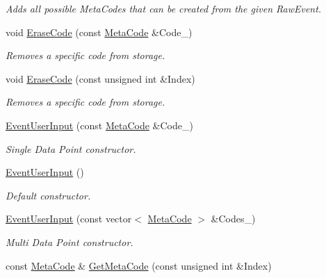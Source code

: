 \begin{DoxyCompactItemize}
\begin{DoxyCompactList}\small\item\em Adds all possible MetaCodes that can be created from the given RawEvent. \item\end{DoxyCompactList}\item 
void \hyperlink{classphys_1_1EventUserInput_a34c05a76a790435799441da75a83fa9c}{EraseCode} (const \hyperlink{classphys_1_1MetaCode}{MetaCode} \&Code\_\-)
\begin{DoxyCompactList}\small\item\em Removes a specific code from storage. \item\end{DoxyCompactList}\item 
void \hyperlink{classphys_1_1EventUserInput_a583084578443019d6e286b8f0e02ce58}{EraseCode} (const unsigned int \&Index)
\begin{DoxyCompactList}\small\item\em Removes a specific code from storage. \item\end{DoxyCompactList}\item 
\hyperlink{classphys_1_1EventUserInput_af54d4604d18b25a2dc99a4a3090b9f1d}{EventUserInput} (const \hyperlink{classphys_1_1MetaCode}{MetaCode} \&Code\_\-)
\begin{DoxyCompactList}\small\item\em Single Data Point constructor. \item\end{DoxyCompactList}\item 
\hyperlink{classphys_1_1EventUserInput_ae7358d184021306da8979000c225845e}{EventUserInput} ()
\begin{DoxyCompactList}\small\item\em Default constructor. \item\end{DoxyCompactList}\item 
\hyperlink{classphys_1_1EventUserInput_a56ca671dd5d28396cab0d7036e08a1f1}{EventUserInput} (const vector$<$ \hyperlink{classphys_1_1MetaCode}{MetaCode} $>$ \&Codes\_\-)
\begin{DoxyCompactList}\small\item\em Multi Data Point constructor. \item\end{DoxyCompactList}\item 
const \hyperlink{classphys_1_1MetaCode}{MetaCode} \& \hyperlink{classphys_1_1EventUserInput_a5f67c5ad4aa4edcce629955fd7d869ac}{GetMetaCode} (const unsigned int \&Index)

\end{DoxyCompactItemize}

